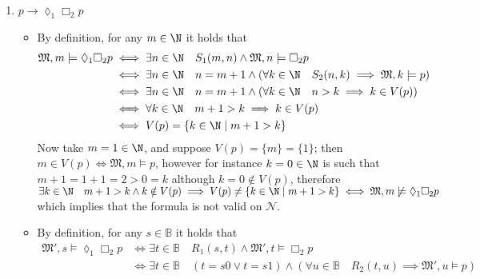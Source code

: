 \documentclass[a4paper, 12pt]{report}
\begin{document}
{\begin{enumerate}[label=(\alph*)]
\begin{itemize}
                \end{itemize}
            \item $p \rightarrow \lozenge_1 \Box_2 p$
                \begin{itemize}
                    \item By definition, for any $m \in \N$ it holds that
                        \begin{equation*}
                            \begin{split}
                                \mathfrak M, m \models \lozenge_1 \Box_2 p &\iff \exists n \in \N \quad S_1(m, n) \land \mathfrak M, n \models \Box_2 p \\
                                                                           &\iff \exists n \in \N \quad n = m + 1 \land (\forall k \in \N \quad S_2(n, k) \implies \mathfrak M, k \models p) \\
                                                                           &\iff \exists n \in \N \quad n = m + 1 \land (\forall k \in \N \quad n > k \implies k \in V(p)) \\
                                                                           &\iff \forall k \in \N \quad m + 1 > k \implies k \in V(p) \\
                                                                           &\iff V(p) = \{k \in \N \mid m + 1 > k\}
                            \end{split}
                        \end{equation*}
                        Now take $m = 1 \in \N$, and suppose $V(p) = \{m\} = \{1\}$; then $m \in V(p) \iff \mathfrak M, m \models p$, however for instance $k = 0 \in \N$ is such that $m + 1 = 1 + 1 = 2 > 0 = k$ although $k = 0 \notin V(p)$, therefore $\exists k \in \N \quad m + 1 > k \land k \notin V(p) \implies V(p) \neq \{k \in \N \mid m + 1 > k\} \iff \mathfrak M, m \not\models \lozenge_1 \Box_2 p$ which implies that the formula is not valid on $\mathcal N$.
                    \item By definition, for any $s \in \mathbb B$ it holds that
                        \begin{equation*}
                            \begin{split}
                                \mathfrak M', s \models \lozenge_1 \Box_2 p &\iff \exists t \in \mathbb B \quad R_1(s, t) \land \mathfrak M', t \models \Box_2 p \\
                                                                           &\iff \exists t \in \mathbb B \quad (t = s0 \lor t = s1) \land (\forall u \in \mathbb B \quad R_2(t, u) \implies \mathfrak M', u \models p) \\

\end{split}
\end{equation*}
\end{itemize}
\end{enumerate}}
\end{document}
